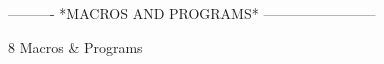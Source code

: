  
 
 
 
 
 
 
 
 
 
 
 
 
 
 
 
 
 
 
 
 
 
 
 
 
 
 
 
 
 
 
 
 
 
 
 
 
 
 
 
 
 
 
 
 
 
 
 
 
 
 
 
 
 
 
 
 
 
 
 
 
 
 
 
 
 
 
----------  *MACROS AND PROGRAMS*  ------------------------
 
8
Macros & Programs
 
 
 
 
 
 
 
 
 
 
 
 
 
 
 
 
 
 
 
 
 
 
 
 
 
 
 
 
 
 
 
 
 
 
 
 
 
 
 
 
 
 
 
 
 
 
 

